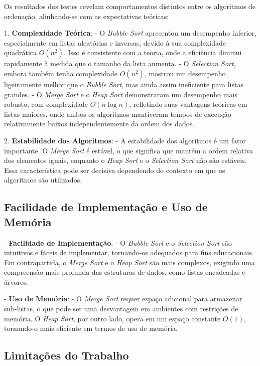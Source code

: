 \documentclass[a4paper,12pt]{article}
\begin{document}
Os resultados dos testes revelam comportamentos distintos entre os algoritmos de ordenação, alinhando-se com as expectativas teóricas:

1. \textbf{Complexidade Teórica}: 
   - O \textit{Bubble Sort} apresentou um desempenho inferior, especialmente em listas aleatórias e inversas, devido à sua complexidade quadrática \(O(n^2)\). Isso é consistente com a teoria, onde a eficiência diminui rapidamente à medida que o tamanho da lista aumenta.
   - O \textit{Selection Sort}, embora também tenha complexidade \(O(n^2)\), mostrou um desempenho ligeiramente melhor que o \textit{Bubble Sort}, mas ainda assim ineficiente para listas grandes.
   - O \textit{Merge Sort} e o \textit{Heap Sort} demonstraram um desempenho mais robusto, com complexidade \(O(n \log n)\), refletindo suas vantagens teóricas em listas maiores, onde ambos os algoritmos mantiveram tempos de execução relativamente baixos independentemente da ordem dos dados.

2. \textbf{Estabilidade dos Algoritmos}: 
   - A estabilidade dos algoritmos é um fator importante. O \textit{Merge Sort} é estável, o que significa que mantém a ordem relativa dos elementos iguais, enquanto o \textit{Heap Sort} e o \textit{Selection Sort} não são estáveis. Essa característica pode ser decisiva dependendo do contexto em que os algoritmos são utilizados.

\subsection{Facilidade de Implementação e Uso de Memória}

- \textbf{Facilidade de Implementação}: 
  - O \textit{Bubble Sort} e o \textit{Selection Sort} são intuitivos e fáceis de implementar, tornando-os adequados para fins educacionais. Em contrapartida, o \textit{Merge Sort} e o \textit{Heap Sort} são mais complexos, exigindo uma compreensão mais profunda das estruturas de dados, como listas encadeadas e árvores.
  
- \textbf{Uso de Memória}: 
  - O \textit{Merge Sort} requer espaço adicional para armazenar sub-listas, o que pode ser uma desvantagem em ambientes com restrições de memória. O \textit{Heap Sort}, por outro lado, opera em um espaço constante \(O(1)\), tornando-o mais eficiente em termos de uso de memória.

\subsection{Limitações do Trabalho}
\end{document}
